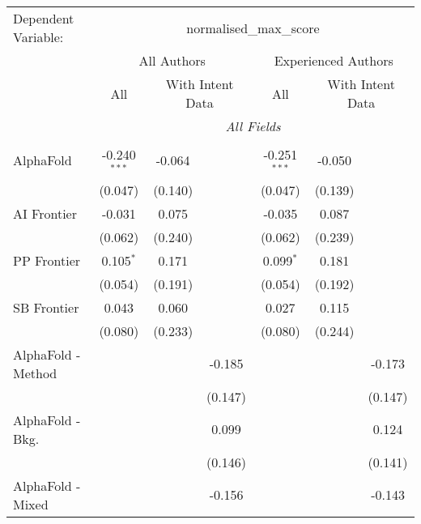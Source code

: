 \begingroup
\centering
\begin{tabular}{lcccccc}
   \tabularnewline \midrule \midrule
   Dependent Variable: & \multicolumn{6}{c}{normalised\_max\_score}\\
 & \multicolumn{3}{c}{All Authors} & \multicolumn{3}{c}{Experienced Authors} \\
\cmidrule(lr){2-4} \cmidrule(lr){5-7}
 & \multicolumn{1}{c}{All} & \multicolumn{2}{c}{With Intent Data} & \multicolumn{1}{c}{All} & \multicolumn{2}{c}{With Intent Data} \\
\cmidrule(lr){2-2} \cmidrule(lr){3-4} \cmidrule(lr){5-5} \cmidrule(lr){6-7}
 & \multicolumn{6}{c}{\textit{All Fields}} \\ \\
   AlphaFold            & -0.240$^{***}$ & -0.064  &              & -0.251$^{***}$ & -0.050  &   \\   
                        & (0.047)        & (0.140) &              & (0.047)        & (0.139) &   \\   
   AI Frontier          & -0.031         & 0.075   &              & -0.035         & 0.087   &   \\   
                        & (0.062)        & (0.240) &              & (0.062)        & (0.239) &   \\   
   PP Frontier          & 0.105$^{*}$    & 0.171   &              & 0.099$^{*}$    & 0.181   &   \\   
                        & (0.054)        & (0.191) &              & (0.054)        & (0.192) &   \\   
   SB Frontier          & 0.043          & 0.060   &              & 0.027          & 0.115   &   \\   
                        & (0.080)        & (0.233) &              & (0.080)        & (0.244) &   \\   
   AlphaFold - Method   &                &         & -0.185       &                &         & -0.173\\   
                        &                &         & (0.147)      &                &         & (0.147)\\   
   AlphaFold - Bkg.     &                &         & 0.099        &                &         & 0.124\\   
                        &                &         & (0.146)      &                &         & (0.141)\\   
   AlphaFold - Mixed    &                &         & -0.156       &                &         & -0.143\\   

\end{tabular}
